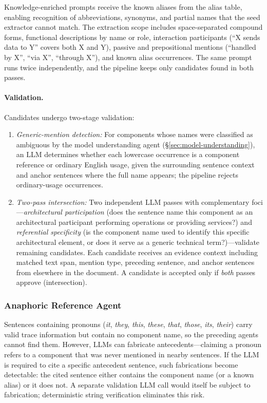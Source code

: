 Knowledge-enriched prompts receive the known aliases from the
alias table, enabling recognition of abbreviations, synonyms, and
partial names that the seed extractor cannot match.
The extraction scope includes space-separated compound forms,
functional descriptions by name or role, interaction participants
(``X sends data to Y'' covers both X and Y),
passive and prepositional mentions (``handled by X'', ``via X'',
``through X''), and known alias occurrences.
The same prompt runs twice independently, and the pipeline keeps
only candidates found in both passes.

\paragraph{Validation.}
Candidates undergo two-stage validation:
\begin{enumerate}
    \item \emph{Generic-mention detection:}
      For components whose names were classified as ambiguous by
      the model understanding agent (\S\ref{sec:model-understanding}),
      an LLM determines whether each lowercase occurrence is a
      component reference or ordinary English usage, given the
      surrounding sentence context and anchor sentences where the
      full name appears;
      the pipeline rejects ordinary-usage occurrences.
    \item \emph{Two-pass intersection:}
      Two independent LLM passes with complementary
      foci---\emph{architectural participation} (does the sentence
      name this component as an architectural participant performing
      operations or providing services?)
      and \emph{referential specificity} (is the component name used
      to identify this specific architectural element, or does it
      serve as a generic technical term?)---validate remaining
      candidates.
      Each candidate receives an evidence context including matched
      text span, mention type, preceding sentence, and anchor
      sentences from elsewhere in the document.
      A candidate is accepted only if \emph{both} passes approve
      (intersection).
\end{enumerate}

\subsubsection{Anaphoric Reference Agent}\label{sec:coref}

Sentences containing pronouns (\emph{it}, \emph{they}, \emph{this},
\emph{these}, \emph{that}, \emph{those}, \emph{its}, \emph{their})
carry valid trace information but contain no component name, so
the preceding agents cannot find them.
However, LLMs can fabricate antecedents---claiming a pronoun refers
to a component that was never mentioned in nearby sentences.
If the LLM is required to cite a specific antecedent sentence,
such fabrications become detectable: the cited sentence either
contains the component name (or a known alias) or it does not.
A separate validation LLM call would itself be subject to
fabrication; deterministic string verification eliminates this risk.

